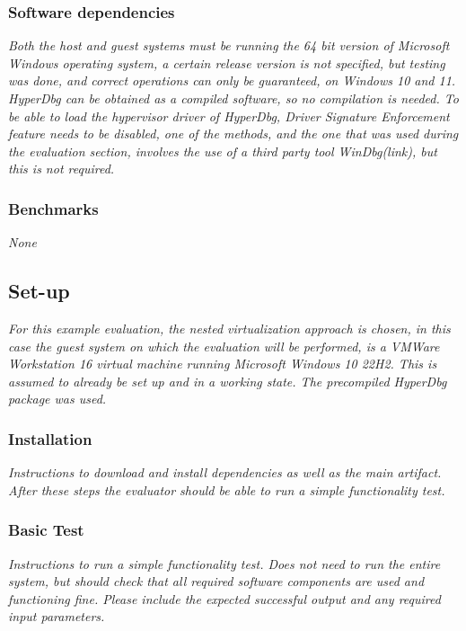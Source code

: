 \subsubsection{Software dependencies}
\textit{Both the host and guest systems must be running the 64 bit version of Microsoft Windows operating system,
a certain release version is not specified, but testing was done, and correct operations can only be guaranteed, on Windows 10 and 11.
HyperDbg can be obtained as a compiled software, so no compilation is needed. To be able to load the hypervisor driver of HyperDbg,
Driver Signature Enforcement feature needs to be disabled, one of the methods, and the one that was used during the evaluation section, involves the use of a third party tool WinDbg(link), but this is not required.}

\subsubsection{Benchmarks}
\textit{None}

\subsection{Set-up}

\textit{For this example evaluation, the nested virtualization approach is chosen, in this case the guest system on which the evaluation will be performed,
is a VMWare Workstation 16 virtual machine running Microsoft Windows 10 22H2. This is assumed to already be set up and in a working state. The precompiled HyperDbg package was used.}

\subsubsection{Installation}
\textit{Instructions to download and install dependencies as
well as the main artifact. After these steps the evaluator should be able to run
a simple functionality test.}

\subsubsection{Basic Test}
\textit{Instructions to run a simple functionality test. Does
not need to run the entire system, but should check that all required software
components are used and functioning fine. Please include the expected successful
output and any required input parameters.}


